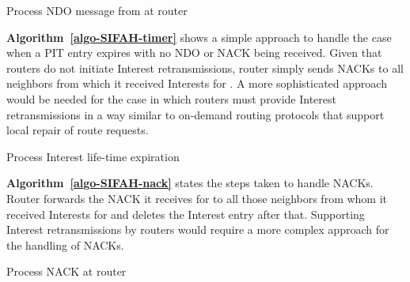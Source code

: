 \documentclass{ancs15-alternate}
\begin{document}
\begin{algorithm}[h]
\caption{Process NDO message from  at router }
\label{algo-SIFAH-Data}
{\fontsize{8}{8}\selectfont
\begin{algorithmic}[1]
\IF{}

  \ELSE

\ENDIF
{}
\end{algorithmic}}       
\end{algorithm}


{\bf  Algorithm~\ref{algo-SIFAH-timer}} shows a simple approach to handle  the case when a PIT entry expires with no NDO or NACK being received.  
Given that routers do not initiate Interest retransmissions, router  simply sends NACKs to all  neighbors from which it received Interests for . 
A more sophisticated approach would be needed for the case  in which routers must provide Interest retransmissions in a way similar to on-demand routing protocols that support local repair of route requests. 

\begin{algorithm}[h]
\caption{Process Interest life-time expiration }
\label{algo-SIFAH-timer}
{\fontsize{8}{8}\selectfont
\begin{algorithmic}[1]

     
\end{algorithmic}}
\end{algorithm}


{\bf Algorithm~\ref{algo-SIFAH-nack}} states the steps taken to handle NACKs.
Router  forwards the NACK it receives for  to all those neighbors from whom it received Interests for  and deletes the Interest entry after that.
Supporting Interest retransmissions by routers would require a more complex approach for the handling of NACKs. 

\begin{algorithm}[h]
\caption{Process NACK  at router }
\label{algo-SIFAH-nack}
{\fontsize{8}{8}\selectfont
\begin{algorithmic}[1]
\IF{ } 
\ELSE	
	\IF{ }


	\ENDIF
\ENDIF
{}
\end{algorithmic}}
\end{algorithm}
\end{document}
